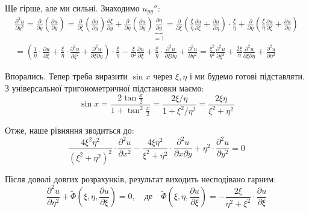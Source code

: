 \documentclass{hw_template}
\begin{document}
Ще гірше, але ми сильні. Знаходимо $u_{yy}''$:
\begin{align*}
    \frac{\partial^2 u}{\partial y^2} = \frac{\partial}{\partial y}\left(\frac{\partial u}{\partial y}\right) = \frac{\partial}{\partial \xi}\left(\frac{\partial u}{\partial y}\right)\frac{\partial \xi}{\partial y} + \frac{\partial}{\partial \eta}\left(\frac{\partial u}{\partial y}\right)\underbrace{\frac{\partial \eta}{\partial y}}_{=1} = \frac{\partial}{\partial \xi}\left(\frac{\xi}{\eta} \frac{\partial u}{\partial \xi} + \frac{\partial u}{\partial \eta}\right) \cdot \frac{\xi}{\eta} + \frac{\partial}{\partial \eta}\left(\frac{\xi}{\eta} \frac{\partial u}{\partial \xi} + \frac{\partial u}{\partial \eta}\right) \\
    = \left(\frac{1}{\eta} \cdot \frac{\partial u}{\partial \xi} + \frac{\xi}{\eta} \cdot \frac{\partial^2 u}{\partial \xi^2} + \frac{\partial^2 u}{\partial\xi\partial\eta}\right) \cdot \frac{\xi}{\eta} - \frac{\xi}{\eta^2} \frac{\partial u}{\partial \xi} + \frac{\xi}{\eta} \cdot \frac{\partial^2 u}{\partial \xi \partial \eta} + \frac{\partial^2 u}{\partial \eta^2} = \boxed{\frac{\xi^2}{\eta^2}\frac{\partial^2 u}{\partial \xi^2} + \frac{2\xi}{\eta} \frac{\partial^2 u}{\partial \xi\partial \eta} + \frac{\partial^2 u}{\partial \eta^2}}
\end{align*}

Впорались. Тепер треба виразити $\sin x$ через $\xi,\eta$ і ми будемо готові підставляти. З універсальної тригонометричної підстановки маємо:
\begin{equation*}
    \sin x = \frac{2\tan \frac{x}{2}}{1+\tan^2\frac{x}{2}} = \frac{2\xi/\eta}{1+\xi^2/\eta^2} = \frac{2\xi\eta}{\xi^2+\eta^2}
\end{equation*}

Отже, наше рівняння зводиться до:
\begin{equation*}
    \frac{4\xi^2\eta^2}{(\xi^2+\eta^2)^2} \cdot \frac{\partial^2 u}{\partial x^2} - \frac{4\xi\eta^2}{\xi^2+\eta^2} \cdot \frac{\partial^2 u}{\partial x\partial y} + \eta^2 \cdot \frac{\partial^2u}{\partial y^2} = 0
\end{equation*}

Після доволі довгих розрахунків, результат виходить несподівано гарним:
\begin{equation*}
    \boxed{\frac{\partial^2 u}{\partial \eta^2} + \widetilde{\Phi}\left(\xi,\eta,\frac{\partial u}{\partial \xi}\right) = 0, \quad \text{де} \quad \widetilde{\Phi}\left(\xi,\eta,\frac{\partial u}{\partial \xi}\right) = -\frac{2\xi}{\eta^2+\xi^2} \cdot \frac{\partial u}{\partial \xi}}
\end{equation*}
\end{document}
